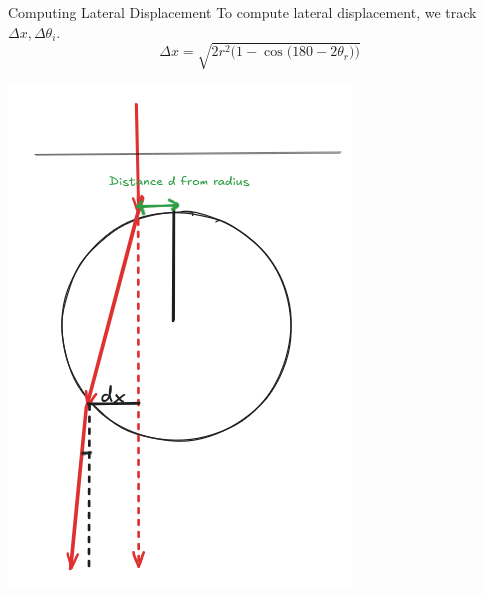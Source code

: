 \documentclass[aspectratio=169,xcolor=dvipsnames]{beamer}
\begin{document}
\begin{frame}{Computing Lateral Displacement}
\centering
To compute lateral displacement, we track $\Delta{x}, \Delta{\theta_i}$.
\[\Delta{x}=\sqrt{2r^2(1-\cos({180-2\theta_r))}}\]

\hspace*{0.1\textwidth} %
\begin{minipage}{0.25\textwidth}
  \centering
  \includegraphics[width=\linewidth]{zoomedindx.png}
\end{minipage}
\hspace{0.05\textwidth}
\begin{minipage}{0.2\textwidth}
  \centering

\end{minipage}
\end{frame}
\end{document}
